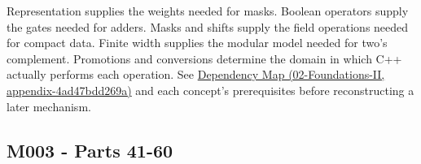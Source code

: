 Representation supplies the weights needed for masks. Boolean operators supply the gates needed for adders. Masks and shifts supply the field operations needed for compact data. Finite width supplies the modular model needed for two's complement. Promotions and conversions determine the domain in which C++ actually performs each operation. See \href{../02-Foundations-II/main.pdf\#nameddest=appendix-4ad47bdd269a}{Dependency Map (02-Foundations-II, appendix-4ad47bdd269a)} and each concept's prerequisites before reconstructing a later mechanism.

\subsection{M003 - Parts 41-60}\label{appendix-fd090d982a15-m003---parts-41-60}

